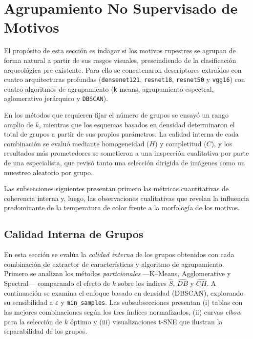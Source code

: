 \section{Agrupamiento No Supervisado de Motivos}

El propósito de esta sección es indagar si los motivos rupestres se agrupan de forma natural a partir de sus rasgos visuales, prescindiendo de la clasificación arqueológica pre-existente.
Para ello se concatenaron descriptores extraídos con cuatro arquitecturas profundas (\texttt{densenet121}, \texttt{resnet18}, \texttt{resnet50} y \texttt{vgg16}) con cuatro algoritmos de agrupamiento (\texttt{k}-means, agrupamiento espectral, aglomerativo jerárquico y \texttt{DBSCAN}).

En los métodos que requieren fijar el número de grupos se ensayó un rango amplio de $k$, mientras que los esquemas basados en densidad determinaron el total de grupos a partir de sus propios parámetros.
La calidad interna de cada combinación se evaluó mediante homogeneidad ($H$) y completitud ($C$), y los resultados más prometedores se sometieron a una inspección cualitativa por parte de una especialista, que revisó tanto una selección dirigida de imágenes como un muestreo aleatorio por grupo.

Las subsecciones siguientes presentan primero las métricas cuantitativas de coherencia interna y, luego, las observaciones cualitativas que revelan la influencia predominante de la temperatura de color frente a la morfología de los motivos.

\subsection{Calidad Interna de Grupos}

En esta sección se evalúa la \emph{calidad interna} de los grupos obtenidos con cada combinación de extractor de características y algoritmo de agrupamiento.
Primero se analizan los métodos \emph{particionales} —K–Means, Agglomerative y Spectral— comparando el efecto de \(k\) sobre los índices \(\widehat S\), \(\widehat{DB}\) y \(\widehat{CH}\).
A continuación se examina el enfoque basado en densidad (DBSCAN), explorando su sensibilidad a \(\varepsilon\) y \texttt{min\_samples}.
Las subsubsecciones presentan (i) tablas con las mejores combinaciones según los tres índices normalizados, (ii) curvas \emph{elbow} para la selección de \(k\) óptimo y (iii) visualizaciones t-SNE que ilustran la separabilidad de los grupos.

